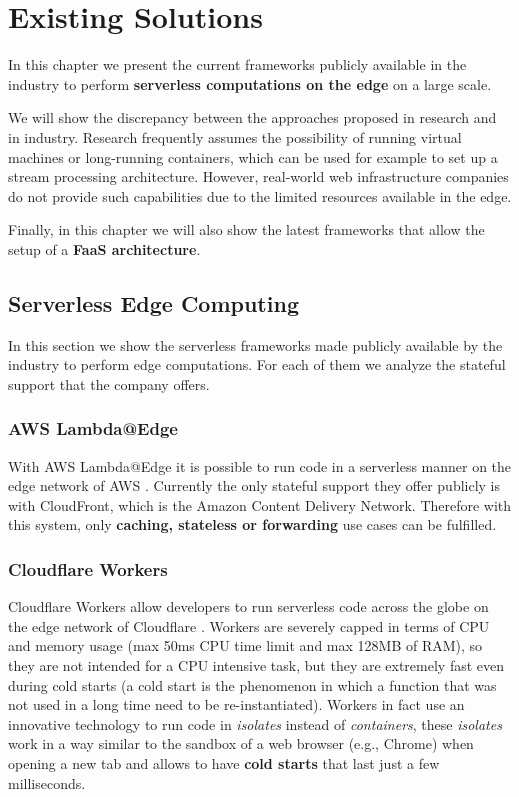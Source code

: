\chapter{Existing Solutions}
\label{ch:existing-solutions}

In this chapter we present the current frameworks publicly available in the industry to perform \textbf{serverless computations on the edge} on a large scale.

We will show the discrepancy between the approaches proposed in research and in industry. Research frequently assumes the possibility of running virtual machines or long-running containers, which can be used for example to set up a stream processing architecture. However, real-world web infrastructure companies do not provide such capabilities due to the limited resources available in the edge.

Finally, in this chapter we will also show the latest frameworks that allow the setup of a \textbf{FaaS architecture}.



\section{Serverless Edge Computing}

In this section we show the serverless frameworks made publicly available by the industry to perform edge computations. For each of them we analyze the stateful support that the company offers.


\subsection{AWS Lambda@Edge}
With AWS Lambda@Edge it is possible to run code in a serverless manner on the edge network of AWS \cite{aws-lambda-at-edge}. Currently the only stateful support they offer publicly is with CloudFront, which is the Amazon Content Delivery Network. Therefore with this system, only \textbf{caching, stateless or forwarding} use cases can be fulfilled.


\subsection{Cloudflare Workers}
Cloudflare Workers allow developers to run serverless code across the globe on the edge network of Cloudflare \cite{cloudflare-workers}. Workers are severely capped in terms of CPU and memory usage (max 50ms CPU time limit and max 128MB of RAM), so they are not intended for a CPU intensive task, but they are extremely fast even during cold starts (a cold start is the phenomenon in which a function that was not used in a long time need to be re-instantiated). Workers in fact use an innovative technology to run code in \textit{isolates} instead of \textit{containers}, these \textit{isolates} work in a way similar to the sandbox of a web browser (e.g., Chrome) when opening a new tab and allows to have \textbf{cold starts} that last just a few milliseconds.

